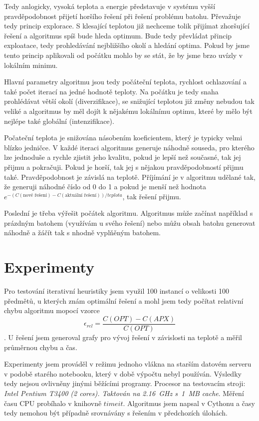 \documentclass[11pt]{article}
\begin{document}
Tedy anlogicky, vysoká teplota a energie představuje v systému vyšší pravděpodobnost přijetí horšího řešení při řešení problému batohu. Převažuje tedy princip explorace. S klesající teplotou již nechceme tolik přijímat zhoršující řešení a algoritmus spíš bude hleda optimum. Bude tedy převládat přincip exploatace, tedy prohledávání nejbližšího okolí a hledání optima. Pokud by jsme tento princip aplikovali od počátku mohlo by se stát, že by jsme brzo uvízly v lokálním minimu. 

Hlavní parametry algoritmu jsou tedy počáteční teplota, rychlost ochlazování a také počet iterací na jedné hodnotě teploty. Na počátku je tedy snaha prohlédávat větší okolí (diverzifikace), se snižující teplotou již změny nebudou tak veliké a algoritmus by měl dojít k nějakému lokálnímu optimu, které by mělo být nejlépe také globální (intenzifikace). 

Počateční teplota je snižována násobením koeficientem, který je typicky velmi blízko jedničce. V každé iteraci algoritmus generuje náhodně souseda, pro kterého lze jednoduše a rychle zjistit jeho kvalitu, pokud je lepší než současné, tak jej přijmu a pokračuji. Pokud je horší, tak jej s nějakou pravděpodobností přijmu také. Pravděpodobnost je závislá na teplotě. Příjímání je v algoritmu udělané tak, že generuji náhodné číslo od 0 do 1 a pokud je menší než hodnota $ e^{-(C(\text{nové řešení})-C(\text{aktuální řešení}))/teplota}$, tak řešení přijmu.

Poslední je třeba výřešit počátek algoritmu. Algoritmus může začínat například s prázdným batohem (využívám u svého řešení) nebo můžu obsah batohu generovat náhodně a žáčít tak s nhodně vyplňěným batohem.

\section{Experimenty}
Pro testování iterativní heuristiky jsem využil 100 instancí o velikosti 100 předmětů, u kterých znám optimální řešení a mohl jsem tedy počítat relativní chybu algoritmu mopocí vzorce $$\epsilon_{rel} = \frac{C(OPT)-C(APX)}{C(OPT)}$$. U řešení jsem generoval grafy pro vývoj řešení v závislosti na teplotě a měřil průměrnou chybu a čas.

Experimenty jsem prováděl v režimu jednoho vlákna na starším datovém serveru v podobě starého notebooku, který v době výpočtu nebyl používán. Výsledky tedy nejsou ovlivněny jinými běžícími programy. Procesor na testovacím stroji: \textit{Intel Pentium T3400 (2 cores). Taktován na 2.16~GHz s~1~MB cache}.
Měření času CPU probíhalo v knihovně $timeit$. Algoritmus jsem napsal v Cythonu a časy tedy nemohou být případně srovnávány s řešením v předchozích úlohách.
\end{document}
